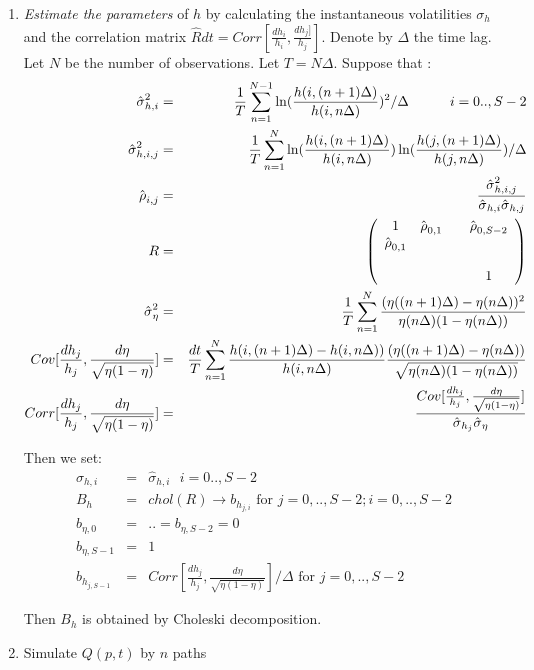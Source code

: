 \documentclass{article}
\begin{document}
\begin{enumerate}
\item \textit{Estimate the parameters} of $h$ by calculating the
instantaneous volatilities $\sigma _{h}$ and the correlation matrix $\hat{R}%
dt=Corr[\frac{dh_{i}}{h_{i}},\frac{dh_{j}]}{h_{j}}]$. Denote by $\Delta $
the time lag. Let $N$ be the number of observations. Let $T=N\Delta $.
Suppose that :%
\begin{eqnarray*}
\hat{\sigma}_{h,i}^{2} &=&\frac{1}{T}\sum_{n=1}^{N-1}\ln (\frac{%
h(i,(n+1)\Delta )}{h(i,n\Delta )})^{2}/\Delta \text{ \ \ \ \ \ \ }i=0..,S-2
\\
\hat{\sigma}_{h,i,j}^{2} &=&\frac{1}{T}\sum_{n=1}^{N}\ln (\frac{%
h(i,(n+1)\Delta )}{h(i,n\Delta )})\ln (\frac{h(j,(n+1)\Delta )}{h(j,n\Delta )%
})/\Delta \\
\hat{\rho}_{i,j} &=&\frac{\hat{\sigma}_{h,i,j}^{2}}{\hat{\sigma}_{h,i}\hat{%
\sigma}_{h,j}} \\
R &=&\left( 
\begin{array}{cccc}
1 & \hat{\rho}_{0,1} &  & \hat{\rho}_{0,S-2} \\ 
\hat{\rho}_{0,1} &  &  &  \\ 
&  &  &  \\ 
&  &  & 1%
\end{array}%
\right) \\
\hat{\sigma}_{\eta }^{2} &=&\frac{1}{T}\sum_{n=1}^{N}\frac{(\eta
((n+1)\Delta )-\eta (n\Delta ))^{2}}{\eta (n\Delta )(1-\eta (n\Delta ))} \\
Cov[\frac{dh_{j}}{h_{j}},\frac{d\eta }{\sqrt{\eta (1-\eta )}}] &=&\frac{dt}{T%
}\sum_{n=1}^{N}\frac{h(i,(n+1)\Delta )-h(i,n\Delta ))}{h(i,n\Delta )}\frac{%
(\eta ((n+1)\Delta )-\eta (n\Delta ))}{\sqrt{\eta (n\Delta )(1-\eta (n\Delta
))}} \\
Corr[\frac{dh_{j}}{h_{j}},\frac{d\eta }{\sqrt{\eta (1-\eta )}}] &=&\frac{Cov[%
\frac{dh_{j}}{h_{j}},\frac{d\eta }{\sqrt{\eta (1-\eta )}}]}{\hat{\sigma}%
_{h_{j}}\hat{\sigma}_{\eta }}
\end{eqnarray*}

Then we set:%
\begin{eqnarray*}
\sigma _{h,i} &=&\hat{\sigma}_{h,i}\text{\ \ \ \ \ \ }i=0..,S-2 \\
B_{h} &=&chol(R)\rightarrow b_{h_{j,i}}\text{ for }j=0,..,S-2;i=0,..,S-2 \\
b_{\eta ,0} &=&..=b_{\eta ,S-2}=0 \\
b_{\eta ,S-1} &=&1 \\
b_{h_{j,S-1}} &=&Corr[\frac{dh_{j}}{h_{j}},\frac{d\eta }{\sqrt{\eta (1-\eta )%
}}]/\Delta \text{ \ \ \ for }j=0,..,S-2
\end{eqnarray*}

Then $B_{h}$ is obtained by Choleski decomposition.

\item Simulate $Q(p,t)$ by $n$ paths
\end{enumerate}
\end{document}
